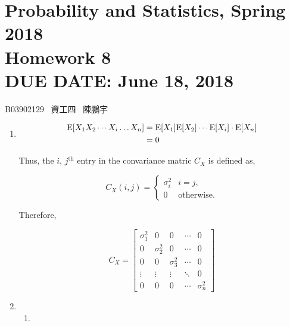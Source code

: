\documentclass{article}
\newcommand{\hmwkClass}{Probability and Statistics, Spring 2018}
\newcommand{\hmwkTitle}{Homework 8}
\newcommand{\hmwkDueDate}{June 18, 2018}
\begin{document}
\thispagestyle{empty}
\section*{\hmwkClass \\
    \normalsize{\hmwkTitle} \\
    \normalsize{DUE DATE: \hmwkDueDate}
}

\hfill{B03902129 \, 資工四 \, 陳鵬宇}

\begin{enumerate}
    \item [8.2.1] 
    
    \begin{align*}
    \text E[X_1X_2 \cdots X_i \dots X_n] 
        & = \text E[X_1] \text E[X_2] \cdots \text E[X_i] \cdot \text E[X_n] \\
        & = 0
    \end{align*}

    Thus, the $i$, $j^{\text{th}}$ entry in the convariance matric $C_X$ is defined as,

    $$C_X(i, j) = \begin{cases}
        \sigma_i^2 & i = j, \\
        0          & \text{otherwise}.
    \end{cases}
    $$

    Therefore,

    $$C_X = \begin{bmatrix}
        \sigma_1^2 & 0 & 0 & \cdots & 0 \\
        0 & \sigma_2^2 & 0 & \cdots & 0 \\
        0 & 0 & \sigma_3^2 & \cdots & 0 \\
        \vdots & \vdots & \vdots & \ddots & 0 \\
        0 & 0 & 0 & \cdots & \sigma_n^2
    \end{bmatrix}
    $$

    \item [8.5.1]

    \begin{enumerate}[label=(\alph*)]
        \item


\end{enumerate}
\end{enumerate}
\end{document}
